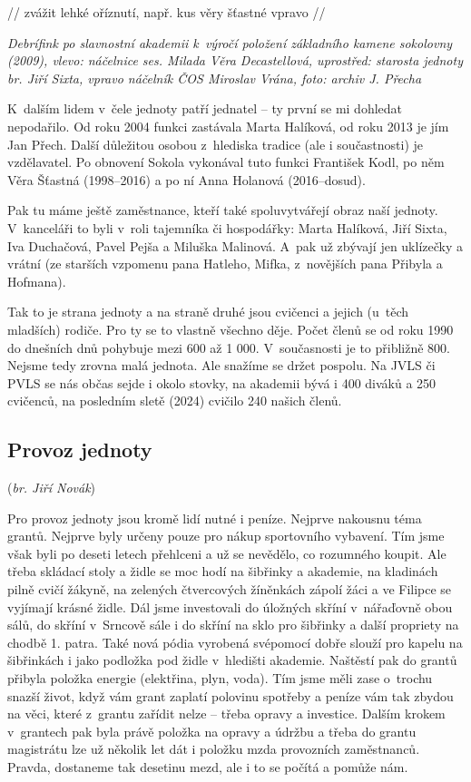 \documentclass[a5paper, 11pt, twoside]{article}
\begin{document}
// zvážit lehké oříznutí, např. kus věry šťastné vpravo //

\textit{Debrífink po slavnostní akademii k~výročí položení základního
kamene sokolovny (2009), vlevo: náčelnice ses. Milada Věra Decastellová,
uprostřed: starosta jednoty br. Jiří Sixta, vpravo náčelník ČOS Miroslav
Vrána, foto: archiv J. Přecha}

K~dalším lidem v~čele jednoty patří jednatel -- ty první se mi dohledat
nepodařilo. Od roku 2004 funkci zastávala Marta Halíková, od roku 2013
je jím Jan Přech. Další důležitou osobou z~hlediska tradice (ale i
součastnosti) je vzdělavatel. Po obnovení Sokola vykonával tuto funkci
František Kodl, po něm Věra Šťastná (1998--2016) a po ní Anna Holanová
(2016--dosud).

Pak tu máme ještě zaměstnance, kteří také spoluvytvářejí obraz naší
jednoty. V~kanceláři to byli v~roli tajemníka či hospodářky: Marta
Halíková, Jiří Sixta, Iva Duchačová, Pavel Pejša a Miluška Malinová.
A~pak už zbývají jen uklízečky a vrátní (ze starších vzpomenu pana
Hatleho, Mifka, z~novějších pana Přibyla a Hofmana).

Tak to je strana jednoty a na straně druhé jsou cvičenci a jejich
(u~těch mladších) rodiče. Pro ty se to vlastně všechno děje. Počet členů se
od roku 1990 do dnešních dnů pohybuje mezi 600 až 1 000. V~současnosti
je to přibližně 800. Nejsme tedy zrovna malá jednota. Ale snažíme se
držet pospolu. Na JVLS či PVLS se nás občas sejde i okolo stovky, na
akademii bývá i 400 diváků a 250 cvičenců, na posledním sletě (2024)
cvičilo 240 našich členů.

\subsection{Provoz jednoty}

(\textit{br. Jiří Novák})

Pro provoz jednoty jsou kromě lidí nutné i peníze. Nejprve nakousnu téma
grantů. Nejprve byly určeny pouze pro nákup sportovního vybavení. Tím
jsme však byli po deseti letech přehlceni a už se nevědělo, co rozumného
koupit. Ale třeba skládací stoly a židle se moc hodí na šibřinky a
akademie, na kladinách pilně cvičí žákyně, na zelených čtvercových
žíněnkách zápolí žáci a ve Filipce se vyjímají krásné židle. Dál jsme
investovali do úložných skříní v~nářaďovně obou sálů, do skříní
v~Srncově sále i do skříní na sklo pro šibřinky a další propriety na
chodbě 1. patra. Také nová pódia vyrobená svépomocí dobře slouží pro
kapelu na šibřinkách i jako podložka pod židle v~hledišti akademie.
Naštěstí pak do grantů přibyla položka energie (elektřina, plyn, voda).
Tím jsme měli zase o~trochu snazší život, když vám grant zaplatí
polovinu spotřeby a peníze vám tak zbydou na věci, které z~grantu
zařídit nelze -- třeba opravy a investice. Dalším krokem v~grantech pak
byla právě položka na opravy a údržbu a třeba do grantu magistrátu lze
už několik let dát i položku mzda provozních zaměstnanců. Pravda,
dostaneme tak desetinu mezd, ale i to se počítá a pomůže nám.
\end{document}
